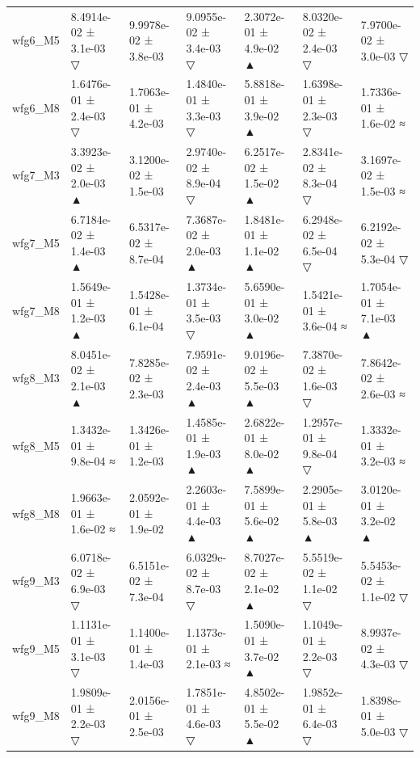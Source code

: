 \begin{tabular}{lllllll}
wfg6\_M5 & 8.4914e-02 ± 3.1e-03 ▽ & 9.9978e-02 ± 3.8e-03 & 9.0955e-02 ± 3.4e-03 ▽ & 2.3072e-01 ± 4.9e-02 ▲ & 8.0320e-02 ± 2.4e-03 ▽ & 7.9700e-02 ± 3.0e-03 ▽ \\
wfg6\_M8 & 1.6476e-01 ± 2.4e-03 ▽ & 1.7063e-01 ± 4.2e-03 & 1.4840e-01 ± 3.3e-03 ▽ & 5.8818e-01 ± 3.9e-02 ▲ & 1.6398e-01 ± 2.3e-03 ▽ & 1.7336e-01 ± 1.6e-02 ≈ \\
wfg7\_M3 & 3.3923e-02 ± 2.0e-03 ▲ & 3.1200e-02 ± 1.5e-03 & 2.9740e-02 ± 8.9e-04 ▽ & 6.2517e-02 ± 1.5e-02 ▲ & 2.8341e-02 ± 8.3e-04 ▽ & 3.1697e-02 ± 1.5e-03 ≈ \\
wfg7\_M5 & 6.7184e-02 ± 1.4e-03 ▲ & 6.5317e-02 ± 8.7e-04 & 7.3687e-02 ± 2.0e-03 ▲ & 1.8481e-01 ± 1.1e-02 ▲ & 6.2948e-02 ± 6.5e-04 ▽ & 6.2192e-02 ± 5.3e-04 ▽ \\
wfg7\_M8 & 1.5649e-01 ± 1.2e-03 ▲ & 1.5428e-01 ± 6.1e-04 & 1.3734e-01 ± 3.5e-03 ▽ & 5.6590e-01 ± 3.0e-02 ▲ & 1.5421e-01 ± 3.6e-04 ≈ & 1.7054e-01 ± 7.1e-03 ▲ \\
wfg8\_M3 & 8.0451e-02 ± 2.1e-03 ▲ & 7.8285e-02 ± 2.3e-03 & 7.9591e-02 ± 2.4e-03 ▲ & 9.0196e-02 ± 5.5e-03 ▲ & 7.3870e-02 ± 1.6e-03 ▽ & 7.8642e-02 ± 2.6e-03 ≈ \\
wfg8\_M5 & 1.3432e-01 ± 9.8e-04 ≈ & 1.3426e-01 ± 1.2e-03 & 1.4585e-01 ± 1.9e-03 ▲ & 2.6822e-01 ± 8.0e-02 ▲ & 1.2957e-01 ± 9.8e-04 ▽ & 1.3332e-01 ± 3.2e-03 ≈ \\
wfg8\_M8 & 1.9663e-01 ± 1.6e-02 ≈ & 2.0592e-01 ± 1.9e-02 & 2.2603e-01 ± 4.4e-03 ▲ & 7.5899e-01 ± 5.6e-02 ▲ & 2.2905e-01 ± 5.8e-03 ▲ & 3.0120e-01 ± 3.2e-02 ▲ \\
wfg9\_M3 & 6.0718e-02 ± 6.9e-03 ▽ & 6.5151e-02 ± 7.3e-04 & 6.0329e-02 ± 8.7e-03 ▽ & 8.7027e-02 ± 2.1e-02 ▲ & 5.5519e-02 ± 1.1e-02 ▽ & 5.5453e-02 ± 1.1e-02 ▽ \\
wfg9\_M5 & 1.1131e-01 ± 3.1e-03 ▽ & 1.1400e-01 ± 1.4e-03 & 1.1373e-01 ± 2.1e-03 ≈ & 1.5090e-01 ± 3.7e-02 ▲ & 1.1049e-01 ± 2.2e-03 ▽ & 8.9937e-02 ± 4.3e-03 ▽ \\
wfg9\_M8 & 1.9809e-01 ± 2.2e-03 ▽ & 2.0156e-01 ± 2.5e-03 & 1.7851e-01 ± 4.6e-03 ▽ & 4.8502e-01 ± 5.5e-02 ▲ & 1.9852e-01 ± 6.4e-03 ▽ & 1.8398e-01 ± 5.0e-03 ▽ \\
\bottomrule
\end{tabular}
